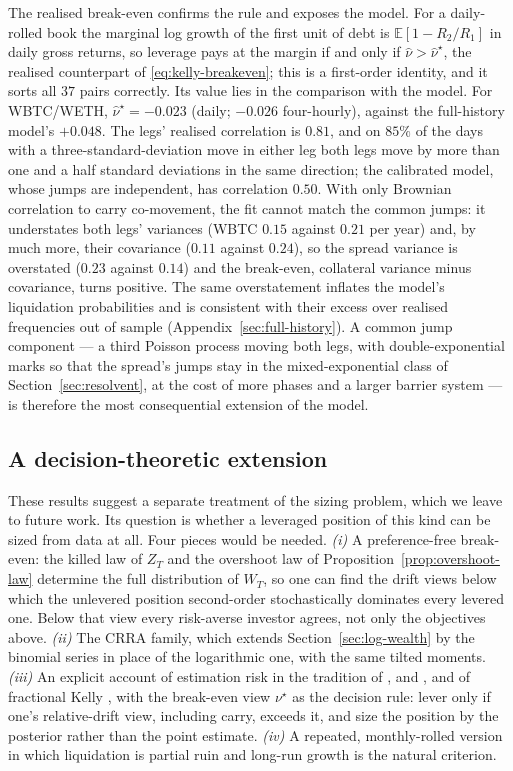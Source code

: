 \documentclass[11pt]{article}
\newcommand{\E}{\mathbb{E}}
\theoremstyle{plain}
\theoremstyle{definition}
\theoremstyle{remark}
\begin{document}
The realised break-even confirms the rule and exposes the model. For a daily-rolled book the
marginal log growth of the first unit of debt is $\E[1-R_2/R_1]$ in daily gross returns, so leverage
pays at the margin if and only if $\hat\nu>\hat\nu^\star$, the realised counterpart of
\eqref{eq:kelly-breakeven}; this is a first-order identity, and it sorts all $37$ pairs correctly.
Its value lies in the comparison with the model. For WBTC/WETH, $\hat\nu^\star=-0.023$ (daily;
$-0.026$ four-hourly), against the full-history model's $+0.048$. The legs' realised correlation is
$0.81$, and on $85\%$ of the days with a three-standard-deviation move in either leg both legs move
by more than one and a half standard deviations in the same direction; the calibrated model, whose jumps are independent, has correlation $0.50$. With only Brownian
correlation to carry co-movement, the fit cannot match the common jumps: it understates both legs'
variances (WBTC $0.15$ against $0.21$ per year) and, by much more, their covariance ($0.11$ against
$0.24$), so the spread variance is overstated ($0.23$ against $0.14$) and the break-even, collateral
variance minus covariance, turns positive. The same overstatement inflates the model's liquidation
probabilities and is consistent with their excess over realised frequencies out of sample
(Appendix~\ref{sec:full-history}). A common jump component --- a third Poisson process
moving both legs, with double-exponential marks so that the spread's jumps stay in the
mixed-exponential class of Section~\ref{sec:resolvent}, at the cost of more phases and a larger
barrier system --- is therefore the most consequential extension of the model.

\subsection{A decision-theoretic extension}\label{sec:extension}
These results suggest a separate treatment of the sizing problem, which we leave to future work.
Its question is whether a leveraged position of this kind can be sized from data at all. Four
pieces would be needed.
\emph{(i)} A preference-free break-even: the killed law of $Z_T$ and the overshoot law of
Proposition~\ref{prop:overshoot-law} determine the full distribution of $W_T$, so one can find the
drift views below which the unlevered position second-order stochastically dominates every levered
one. Below that view every risk-averse investor agrees, not only the objectives above.
\emph{(ii)} The CRRA family, which extends Section~\ref{sec:log-wealth} by the binomial series in
place of the logarithmic one, with the same tilted moments.
\emph{(iii)} An explicit account of estimation risk in the tradition of
\citet{Barberis2000}, \citet{KanZhou2007} and \citet{DeMiguel2007}, and of fractional Kelly
\citep{MacLeanThorpZiemba2011}, with the break-even view $\nu^\star$ as the decision rule: lever only
if one's relative-drift view, including carry, exceeds it, and size the position by the posterior
rather than the point estimate.
\emph{(iv)} A repeated, monthly-rolled version in which liquidation is partial ruin and long-run
growth is the natural criterion.
\end{document}
